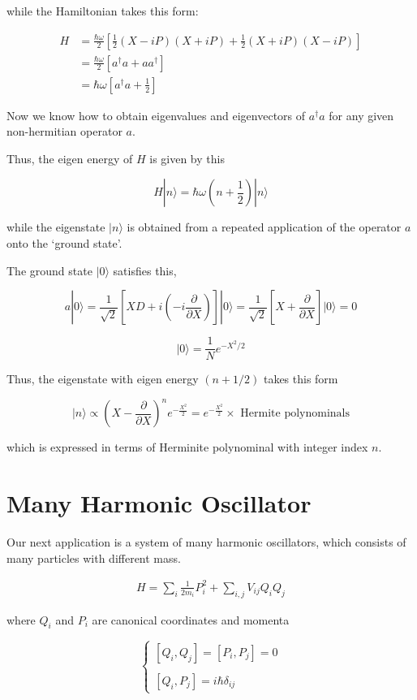 ﻿\documentclass[twoside]{book}
\numberwithin{equation}{section}
\begin{document}
while the Hamiltonian takes this form:

\[\begin{split}
H &= \frac{\hbar\omega}{2}\left[\frac{1}{2}(X-iP)(X+iP)+\frac{1}{2}(X+iP)(X-iP)\right]\\
&=\frac{\hbar\omega}{2}[a^\dagger a+a a^\dagger]\\
&=\hbar\omega\left[a^\dagger a+\frac{1}{2}\right]
\end{split} \]

Now we know how to obtain eigenvalues and eigenvectors of $a^\dagger a$ for any given non-hermitian operator $a$. 

Thus, the eigen energy of $H$ is given by this

\[H|n\rangle = \hbar\omega\left(n+\frac{1}{2}\right)|n\rangle \]

while the eigenstate $|n\rangle$ is obtained from a repeated application of the operator $a$ onto the `ground state'. 

The ground state $|0\rangle$ satisfies this, 

\[a|0\rangle = \frac{1}{\sqrt{2}}\left[XD+i\left(-i\frac{\partial}{\partial X}\right)\right]|0\rangle = \frac{1}{\sqrt{2}}\left[X+\frac{\partial}{\partial X}\right]|0\rangle = 0 \]

\[|0\rangle = \frac{1}{N}e^{-X^2/2} \]

Thus, the eigenstate with eigen energy $(n+1/2)$ takes this form

\[|n\rangle \propto \left(X-\frac{\partial}{\partial X}\right)^n e^{-\frac{X^2}{2}} = e^{-\frac{X^2}{2}}\times\text{ Hermite polynominals} \]

which is expressed in terms of Herminite polynominal with integer index $n$. 




\section{Many Harmonic Oscillator}

Our next application is a system of many harmonic oscillators, which consists of many particles with different mass. 

\begin{align}
H = \sum_i \frac{1}{2m_i}P_i^2+\sum_{i,j}V_{ij}Q_iQ_j
\end{align}

where $Q_i$ and $P_i$ are canonical coordinates and momenta

\[\begin{cases}
[Q_i,Q_j] = [P_i,P_j] = 0\\
\ \\
[Q_i,P_j] = i\hbar\delta_{ij}
\end{cases}\]
\end{document}
